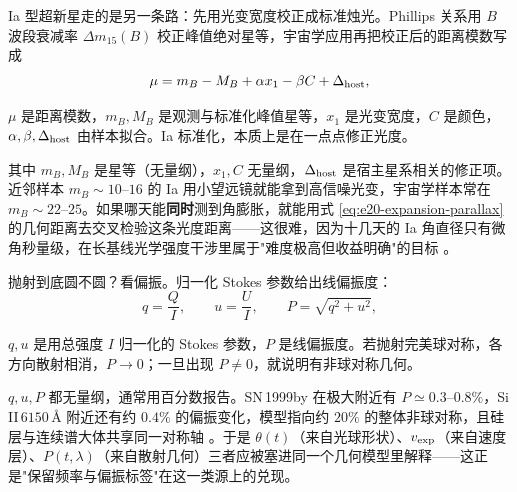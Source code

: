Ia 型超新星走的是另一条路：先用光变宽度校正成标准烛光。Phillips 关系用 \(B\) 波段衰减率 \(\Delta m_{15}(B)\) 校正峰值绝对星等，宇宙学应用再把校正后的距离模数写成
\begin{equation}
  \mu = m_B - M_B + \alpha x_1-\beta C+\Delta_{\rm host},
  \label{eq:e20-snia-distance-modulus}
\end{equation}
\begin{formulaexplain}
\(\mu\) 是距离模数，\(m_B,M_B\) 是观测与标准化峰值星等，\(x_1\) 是光变宽度，\(C\) 是颜色，\(\alpha,\beta,\Delta_{\rm host}\) 由样本拟合。Ia 标准化，本质上是在一点点修正光度。
\end{formulaexplain}
其中 \(m_B,M_B\) 是星等（无量纲），\(x_1,C\) 无量纲，\(\Delta_{\rm host}\) 是宿主星系相关的修正项。近邻样本 \(m_B\sim10\text{--}16\) 的 Ia 用小望远镜就能拿到高信噪光变，宇宙学样本常在 \(m_B\sim22\text{--}25\)。如果哪天能\textbf{同时}测到角膨胀，就能用式 \eqref{eq:e20-expansion-parallax} 的几何距离去交叉检验这条光度距离——这很难，因为十几天的 Ia 角直径只有微角秒量级，在长基线光学强度干涉里属于"难度极高但收益明确"的目标 \citep{1993ApJ...413L.105P,1998AJ....116.1009R,1999ApJ...517..565P}。

抛射到底圆不圆？看偏振。归一化 Stokes 参数给出线偏振度：
\begin{equation}
  q=\frac{Q}{I},\qquad
  u=\frac{U}{I},\qquad
  P=\sqrt{q^2+u^2},
  \label{eq:e20-stokes-polarization}
\end{equation}
\begin{formulaexplain}
\(q,u\) 是用总强度 \(I\) 归一化的 Stokes 参数，\(P\) 是线偏振度。若抛射完美球对称，各方向散射相消，\(P\to0\)；一旦出现 \(P\neq0\)，就说明有非球对称几何。
\end{formulaexplain}
\(q,u,P\) 都无量纲，通常用百分数报告。SN\,1999by 在极大附近有 \(P\simeq0.3\text{--}0.8\%\)，Si\,II\,\(6150\,\text{\AA}\) 附近还有约 \(0.4\%\) 的偏振变化，模型指向约 \(20\%\) 的整体非球对称，且硅层与连续谱大体共享同一对称轴 \citep{2001ApJ...556..302H}。于是 \(\theta(t)\)（来自光球形状）、\(v_{\rm exp}\)（来自速度层）、\(P(t,\lambda)\)（来自散射几何）三者应被塞进同一个几何模型里解释——这正是"保留频率与偏振标签"在这一类源上的兑现。

